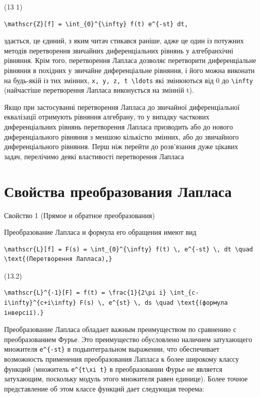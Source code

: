 \documentclass[
  ukrainian,
]{article}
\begin{document}
(13 1)

\begin{verbatim}
\mathscr{Z}[f] = \int_{0}^{\infty} f(t) e^{-st} dt,
\end{verbatim}

здається, це єдиний, з яким читач стикався раніше, адже це один із
потужних методів перетворення звичайних диференціальних рівнянь у
алгебранхічні рівняння. Крім того, перетворення Лапласа дозволяє
перетворити диференціальне рівняння в похідних у звичайне диференціальне
рівняння, і його можна виконати на будь-якій із тих змінних,
\texttt{x,\ y,\ z,\ t\ \textbackslash{}ldots} які змінюються від 0 до
\texttt{\textbackslash{}infty} (найчастіше перетворення Лапласа
виконується на змінній t).

Якщо при застосуванні перетворення Лапласа до звичайної диференціальної
еквалізації отримують рівняння алгебрану, то у випадку часткових
диференціальних рівнянь перетворення Лапласа призводить або до нового
диференціального рівняння з меншою кількістю змінних, або до звичайного
диференціального рівняння. Перш ніж перейти до розв'язання дуже цікавих
задач, перелічимо деякі властивості перетворення Лапласа

\section{Свойства преобразования
Лапласа}\label{ux441ux432ux43eux439ux441ux442ux432ux430-ux43fux440ux435ux43eux431ux440ux430ux437ux43eux432ux430ux43dux438ux44f-ux43bux430ux43fux43bux430ux441ux430}

Свойство 1 (Прямое и обратное преобразования)

Преобразование Лапласа и формула его обращения имеют вид

\begin{verbatim}
\mathscr{L}[f] = F(s) = \int_{0}^{\infty} f(t) \, e^{-st} \, dt \quad \text{(Перетворення Лапласа),}
\end{verbatim}

(13.2)

\begin{verbatim}
\mathscr{L}^{-1}[F] = f(t) = \frac{1}{2\pi i} \int_{c-i\infty}^{c+i\infty} F(s) \, e^{st} \, ds \quad \text{(формула інверсії).}
\end{verbatim}

Преобразование Лапласа обладает важным преимуществом по сравнению с
преобразованием Фурье. Это преимущество обусловлено наличием затухающего
множителя \texttt{e\^{}\{-st\}} в подынтегральном выражении, что
обеспечивает возможность применения преобразования Лапласа к более
широкому классу функций (множитель
\texttt{e\^{}\{t\textbackslash{}xi\ t\}} в преобразовании Фурье не
является затухающим, поскольку модуль этого множителя равен единице).
Более точное представление об этом классе функций дает следующая
теорема:
\end{document}
